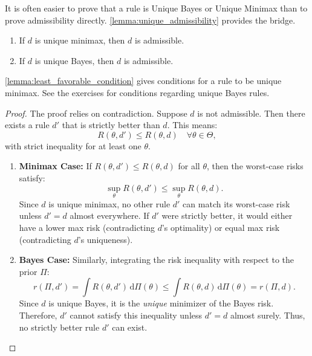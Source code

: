 It is often easier to prove that a rule is Unique Bayes or Unique Minimax than to prove admissibility directly. \autoref{lemma:unique_admissibility} provides the bridge.

\begin{lemma}[]
\label{lemma:unique_admissibility}

\leavevmode
\begin{enumerate}
    \item[(i)] If \(d\) is unique minimax, then \(d\) is admissible.
    \item[(ii)] If \(d\) is unique Bayes, then \(d\) is admissible.
\end{enumerate}
\end{lemma}

\begin{remark}[]
    \autoref{lemma:least_favorable_condition} gives conditions for a rule to be unique minimax. See the exercises for conditions regarding unique Bayes rules.
\end{remark}

\begin{proof}
The proof relies on contradiction. Suppose \(d\) is not admissible. Then there exists a rule \(d'\) that is strictly better than \(d\). This means:
\[ R(\theta, d') \le R(\theta, d) \quad \forall \theta \in \Theta, \]
with strict inequality for at least one \(\theta\).

\begin{enumerate}
    \item[(i)] \textbf{Minimax Case:}
    If \(R(\theta, d') \le R(\theta, d)\) for all \(\theta\), then the worst-case risks satisfy:
    \[ \sup_{\theta} R(\theta, d') \le \sup_{\theta} R(\theta, d). \]
    Since \(d\) is unique minimax, no other rule \(d'\) can match its worst-case risk unless \(d' = d\) almost everywhere. If \(d'\) were strictly better, it would either have a lower max risk (contradicting \(d\)'s optimality) or equal max risk (contradicting \(d\)'s uniqueness).
    
    \item[(ii)] \textbf{Bayes Case:}
    Similarly, integrating the risk inequality with respect to the prior \(\Pi\):
    \[ r(\Pi, d') = \int R(\theta, d') \, \mathrm{d}\Pi(\theta) \le \int R(\theta, d) \, \mathrm{d}\Pi(\theta) = r(\Pi, d). \]
    Since \(d\) is unique Bayes, it is the \emph{unique} minimizer of the Bayes risk. Therefore, \(d'\) cannot satisfy this inequality unless \(d' = d\) almost surely. Thus, no strictly better rule \(d'\) can exist.
\end{enumerate}
\end{proof}




